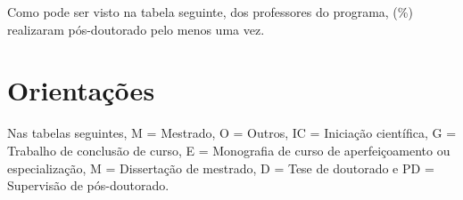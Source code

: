 \documentclass[12pt,brazil]{article}\usepackage[]{graphicx}\usepackage[]{xcolor}
\makeatletter
\newenvironment{kframe}{%
 \def\at@end@of@kframe{}%
 \ifinner\ifhmode%
  \def\at@end@of@kframe{\end{minipage}}%
  \begin{minipage}{\columnwidth}%
 \fi\fi%
 \def\FrameCommand##1{\hskip\@totalleftmargin \hskip-\fboxsep
 \colorbox{shadecolor}{##1}\hskip-\fboxsep
     \hskip-\linewidth \hskip-\@totalleftmargin \hskip\columnwidth}%
 \MakeFramed {\advance\hsize-\width
   \@totalleftmargin\z@ \linewidth\hsize
   \@setminipage}}%
 {\par\unskip\endMakeFramed%
 \at@end@of@kframe}
\newcounter{tabela}
\makeatother
\begin{document}
\clearpage

Como pode ser visto na tabela seguinte, dos 
professores do programa, 
(\%)
realizaram pós-doutorado pelo menos uma vez.

\begin{kframe}


{\ttfamily\noindent\bfseries\color{errorcolor}{\#\# Error in seq\_len(ncol(tab)): argumento deve ser coercível para um inteiro não-negativo}}\end{kframe}

\clearpage

\begin{kframe}


{\ttfamily\noindent\bfseries{}}\end{kframe}

\newpage

\section{Orientações}

Nas tabelas seguintes,
M = Mestrado,
O = Outros,
IC = Iniciação científica,
G = Trabalho de conclusão de curso,
E = Monografia de curso de aperfeiçoamento ou especialização,
M = Dissertação de mestrado,
D = Tese de doutorado e
PD = Supervisão de pós-doutorado.
\end{document}
